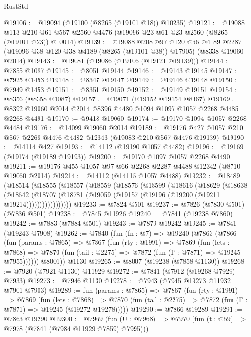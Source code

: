 \begin{lexlean}{RustStd}
\begin{coremodule}
@19106 := @19094 (@19100 (@8265 (@19101 @18)) @10235)
@19121 := @19088
    @113
    @210
    @61
    @567
    @2560
    @4476
    (@19096 @23 @61 @23 @2560 (@8265 (@19101 @23)) @10014)
@19139 := @19088
    @208
    @97
    @120
    @66
    @4189
    @2287
    (@19096 @38 @120 @38 @4189 (@8265 (@19101 @38)) @17905)
    (@8338 @19060 @2014)
@19143 := @19081 (@19086 (@19106 (@19121 @19139)))
@19144 := @7855 @1087
@19145 := @8051 @19144
@19146 := @19143 @19145
@19147 := @7925 @1453
@19148 := @8347 @19147
@19149 := @19146 @19148
@19150 := @7949 @1453
@19151 := @8351 @19150
@19152 := @19149 @19151
@19154 := @8356 (@8358 @1087)
@19157 := @19071 (@19152 @19154 @8367)
@19169 := @8392 @19060 @2014 @2014 @8396 @4480 @1094 @1097 @1057 @2268 @4485 @2268 @4491
@19170 := @9418 @19060
@19174 := @19170 @1094 @1057 @2268 @4484
@19176 := @14099 @19060 @2014
@19189 := @19176 @427 @1057 @210 @567 @2268 @4476 @4482 @12343 (@19083 @210 @567 @4476 @19139)
@19190 := @14114 @427
@19193 := @14112 (@19190 @1057 @4482)
@19196 := @19169 (@19174 (@19189 @19193))
@19200 := @19170 @1097 @1057 @2268 @4490
@19211 := @19176 @455 @1057 @97 @66 @2268 @2287 @4488 @12342 (@8710 @19060 @2014)
@19214 := @14112 (@14115 @1057 @4488)
@19232 := @18489
    (@18514
      (@18555
        (@18557
          (@18559
            (@18576
              (@18599
                (@18616
                  (@18629
                    (@18638
                      (@18642
                        (@18707
                          (@18781 (@19059 (@19157 (@19196 (@19200 (@19211 @19214)))))))))))))))))
@19233 := @7824 @501
@19237 := @7826 (@7830 @501) (@7836 @501)
@19238 := @7845 @11926
@19240 := @7841 (@19238 @7860)
@19242 := @7883 (@7884 @501)
@19243 := @7879 @19242
@19245 := @7841 (@19243 @7908)
@19262 := @7840
    (fun (fn : @7) =>
    @19240
      (@7863
        (@7866
          (fun (params : @7865) =>
          @7867
            (fun (rty : @1991) =>
            @7869
              (fun (lets : @7868) =>
              @7870 (fun (tail : @2275) => @7872 (fun (Γ : @7871) => @19245 @7955))))))
        @8001))
    @1130
@19265 := @8007 (@19238 (@7858 @1130))
@19268 := @7920 (@7921 @1130) @11929
@19272 := @7841 (@7912 (@19268 @7929) @7933)
@19273 := @7946 @1130
@19278 := @7943 (@7945 @19273 @11932 @7901 @7903)
@19289 := fun (params : @7865) =>
  @7867
    (fun (rty : @1991) =>
    @7869
      (fun (lets : @7868) =>
      @7870 (fun (tail : @2275) => @7872 (fun (Γ : @7871) => @19245 (@19272 @19278)))))
@19290 := @7866 @19289
@19291 := @7863 @19290
@19300 := @7969
    (fun (U : @7968) => @7970 (fun (t : @59) => @7978 (@7841 (@7984 @11929 @7859) @7995)))

\end{coremodule}
\end{lexlean}
